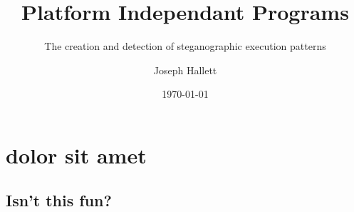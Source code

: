 \documentclass{jahdoc}
\title{Platform Independant Programs}
\subtitle{The creation and detection of steganographic execution patterns}
\author{Joseph Hallett}
\date\today
\begin{document}
  \frontmatter
    \maketitle
    \clearpage
    
    \clearpage
    \tableofcontents
    \listoffigures
    \clearpage
    \listoftables

  \mainmatter


\chapter{dolor sit amet}
\section{Isn't this fun?}

\lipsum[1]
\sidenote{\lipsum[2]}
\cite{dummy}

\appendix


\end{document}
